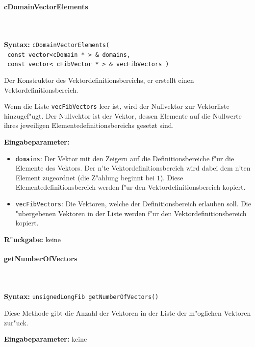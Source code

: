 \paragraph{cDomainVectorElements}

\ \\\\\noindent
\textbf{Syntax:} \verb|cDomainVectorElements( | \\\verb| const vector<cDomain * > & domains, | \\\verb| const vector< cFibVector * > & vecFibVectors )|

\bigskip\noindent
Der Konstruktor des Vektordefinitionsbereichs, er erstellt einen Vektordefinitionsbereich.

Wenn die Liste \verb|vecFibVectors| leer ist, wird der Nullvektor zur Vektorliste hinzugef"ugt. Der Nullvektor ist der Vektor, dessen Elemente auf die Nullwerte ihres jeweiligen Elementedefinitionsbereichs gesetzt sind.

\bigskip\noindent
\textbf{Eingabeparameter:}
\begin{itemize}
 \item \verb|domains|: Der Vektor mit den Zeigern auf die Definitionsbereiche f"ur die Elemente des Vektors. Der n'te Vektordefinitionsbereich wird dabei dem n'ten Element zugeordnet (die Z"ahlung beginnt bei $1$). Diese Elementedefinitionsbereich werden f"ur den Vektordefinitionsbereich kopiert.
 \item \verb|vecFibVectors|: Die Vektoren, welche der Definitionsbereich erlauben soll. Die "ubergebenen Vektoren in der Liste werden f"ur den Vektordefinitionsbereich kopiert.
\end{itemize}

\bigskip\noindent
\textbf{R"uckgabe:} keine


\paragraph{getNumberOfVectors}

\ \\\\\noindent
\textbf{Syntax:} \verb|unsignedLongFib getNumberOfVectors()|

\bigskip\noindent
Diese Methode gibt die Anzahl der Vektoren in der Liste der m"oglichen Vektoren zur"uck.

\bigskip\noindent
\textbf{Eingabeparameter:} keine

